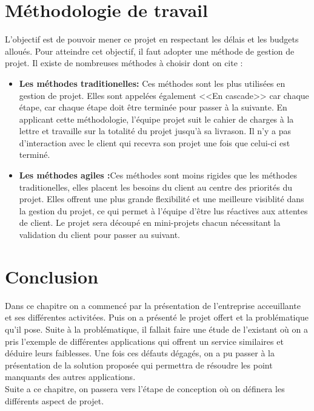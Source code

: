 \section{Méthodologie de travail}
L'objectif est de pouvoir mener ce projet en respectant les délais et les budgets alloués. Pour atteindre cet objectif, il faut adopter une méthode de gestion de projet. Il existe de nombreuses méthodes à choisir dont on cite :
\begin{itemize}
    \item \textbf{Les méthodes traditionelles: }Ces méthodes sont les plus utilisées en gestion de projet. Elles sont appelées également <<En cascade>> car chaque étape, car chaque étape doit être terminée pour passer à la suivante. En applicant cette méthodologie, l'équipe projet suit le cahier de charges à la lettre et travaille sur la totalité du projet jusqu'à sa livrason. Il n'y a pas d'interaction avec le client qui recevra son projet une fois que celui-ci est terminé.
    \item \textbf{Les méthodes agiles :}Ces méthodes sont moins rigides que les méthodes traditionelles, elles placent les besoins du client au centre des priorités du projet. Elles offrent une plus grande flexibilité et une meilleure visiblité dans la gestion du projet, ce qui permet à l'équipe d'être lus réactives aux attentes de client. Le projet sera découpé en mini-projets chacun nécessitant la validation du client pour passer au suivant.
\end{itemize}
\section*{Conclusion}
Dans ce chapitre on a commencé par la présentation de l'entreprise acceuillante et ses différentes activitées. Puis on a présenté le projet offert et la problématique qu'il pose. Suite à la problématique, il fallait faire une étude de l'existant où on a pris l'exemple de différentes applications qui offrent un service similaires et déduire leurs faiblesses. Une fois ces défauts dégagés, on a pu passer à la présentation de la solution proposée qui permettra de résoudre les point manquants des autres applications.\\
Suite a ce chapitre, on passera vers l'étape de conception où on définera les différents aspect de projet.